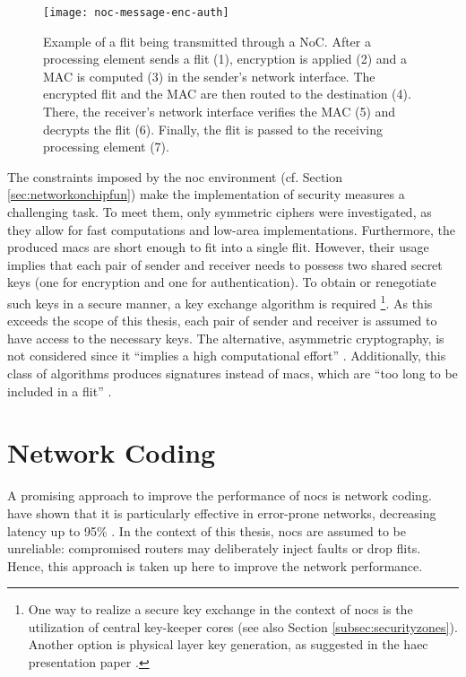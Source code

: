 \begin{figure}
    \centering
    \texttt{[image: noc-message-enc-auth]}
    \caption[Flit through NoC with encryption and authentication]{Example of a flit being transmitted through a NoC. After a processing element sends a flit (1),
    encryption is applied (2) and a MAC is computed (3) in the sender's network interface. The encrypted flit and the MAC are then routed to the
    destination (4). There, the receiver's network interface verifies the MAC (5) and decrypts the flit (6). Finally, the flit is passed to the
    receiving processing element (7).} %
    \label{fig:nocflitencauth}
\end{figure}

The constraints imposed by the \gls{noc} environment (cf. Section \ref{sec:networkonchipfun}) make the implementation of security measures a
challenging task. To meet them, only symmetric ciphers were investigated, as they allow for fast computations and low-area implementations.
Furthermore, the produced \glspl{mac} are short enough to fit into a single flit. However, their usage implies that each pair of
sender and receiver needs to possess two shared secret keys (one for encryption and one for authentication). To obtain or renegotiate
such keys in a secure manner, a key exchange algorithm is required
\footnote{One way to realize a secure key exchange in the context of \glspl{noc} is the utilization of central key-keeper cores
\cite{gebotys03securityframework} (see also Section \ref{subsec:securityzones}). Another option is physical layer key generation, as suggested in the
\gls{haec} presentation paper \cite[4]{matthiesen17haec}.}.
As this exceeds the scope of this thesis, each pair of sender and receiver is assumed to have access to the necessary keys. The alternative, asymmetric
cryptography, is not considered since it \enquote{implies a high computational effort} \cite[3]{moriam18activeattackers}. Additionally, this class of
algorithms produces signatures instead of \glspl{mac}, which are \enquote{too long to be included in a flit} \cite[3]{moriam18activeattackers}.

\section{Network Coding}\label{sec:networkcodingover}
A promising approach to improve the performance of \glspl{noc} is network coding. \citeauthor{moriam15manycorenc} have shown that it is particularly
effective in error-prone networks, decreasing latency up to 95\% \cite[7]{moriam15manycorenc}. In the context of this thesis, \glspl{noc} are assumed
to be unreliable: compromised routers may deliberately inject faults or drop flits. Hence, this approach is taken up here to improve the network
performance.

